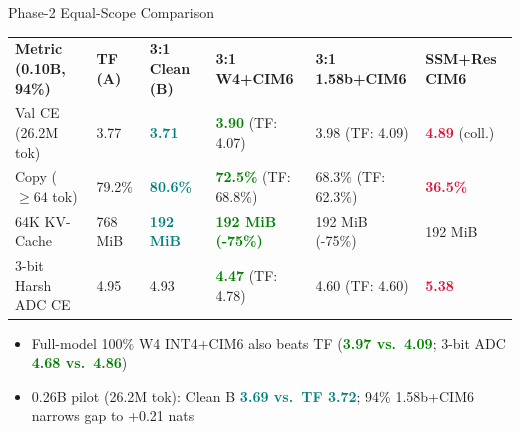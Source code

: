 \documentclass[aspectratio=169,10pt]{beamer}
\newcommand{\accentt}[1]{\textcolor{Teal}{\textbf{#1}}}
\newcommand{\accentg}[1]{\textcolor{Green}{\textbf{#1}}}
\newcommand{\accentr}[1]{\textcolor{Crimson}{\textbf{#1}}}
\begin{document}
\begin{frame}{Phase-2 Equal-Scope Comparison}
  \vspace*{0.16cm}
  \begin{center}
  \footnotesize
  \setlength{\tabcolsep}{3.2pt}
  \renewcommand{\arraystretch}{1.50}
  \begin{tabular}{@{}llllll@{}}
    \textbf{\color{Teal}Metric (0.10B, 94\%)} & \textbf{\color{Teal}TF (A)} & \textbf{\color{Teal}3:1 Clean (B)} & \textbf{\color{Teal}3:1 W4+CIM6} & \textbf{\color{Teal}3:1 1.58b+CIM6} & \textbf{\color{Teal}SSM+Res CIM6} \\
    \arrayrulecolor{Hairline}\midrule
    Val CE {\scriptsize (26.2M tok)} & 3.77 & \accentt{3.71} & \accentg{3.90} {\scriptsize (TF: 4.07)} & 3.98 {\scriptsize (TF: 4.09)} & \accentr{4.89} {\scriptsize (coll.)} \\
    \midrule
    Copy {\scriptsize ($\ge 64$ tok)} & 79.2\% & \accentt{80.6\%} & \accentg{72.5\%} {\scriptsize (TF: 68.8\%)} & 68.3\% {\scriptsize (TF: 62.3\%)} & \accentr{36.5\%} \\
    \midrule
    64K KV-Cache & 768 MiB & \accentt{192 MiB} & \accentg{192 MiB (-75\%)} & 192 MiB (-75\%) & 192 MiB \\
    \midrule
    3-bit Harsh ADC CE & 4.95 & 4.93 & \accentg{4.47} {\scriptsize (TF: 4.78)} & 4.60 {\scriptsize (TF: 4.60)} & \accentr{5.38} \\
    \bottomrule
  \end{tabular}
  \end{center}
  \vspace*{0.28cm}
  \begin{itemize}\setlength{\itemsep}{0.42em}
    \item {\small Full-model 100\% W4 INT4+CIM6 also beats TF (\accentg{3.97 vs.\ 4.09}; 3-bit ADC \accentg{4.68 vs.\ 4.86})}
    \item {\small 0.26B pilot (26.2M tok): Clean B \accentt{3.69 vs.\ TF 3.72}; 94\% 1.58b+CIM6 narrows gap to +0.21 nats}
  \end{itemize}
\end{frame}
\end{document}
